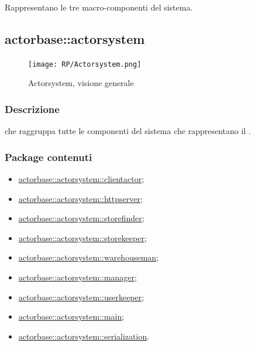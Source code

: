 \documentclass{scalatekids-article}
\begin{document}
Rappresentano le tre macro-componenti del sistema.


\subsection{actorbase::actorsystem} %
\label{sec:actorbase::actorsystem}

\begin{figure}[H]
  \begin{center}
    \texttt{[image: RP/Actorsystem.png]}
    \caption{Actorsystem, visione generale}
  \end{center}
\end{figure}

\subsubsection{Descrizione}

 che raggruppa tutte le componenti del sistema che
rappresentano il .

\subsubsection{Package contenuti}

\begin{itemize}
\item \hyperref[sec:actorbase::actorsystem::clientactor]{actorbase::actorsystem::clientactor};
\item \hyperref[sec:actorbase::actorsystem::httpserver]{actorbase::actorsystem::httpserver};
\item \hyperref[sec:actorbase::actorsystem::storefinder]{actorbase::actorsystem::storefinder};
\item \hyperref[sec:actorbase::actorsystem::storekeeper]{actorbase::actorsystem::storekeeper};
\item \hyperref[sec:actorbase::actorsystem::warehouseman]{actorbase::actorsystem::warehouseman};
\item \hyperref[sec:actorbase::actorsystem::manager]{actorbase::actorsystem::manager};
\item \hyperref[sec:actorbase::actorsystem::userkeeper]{actorbase::actorsystem::userkeeper};
\item \hyperref[sec:actorbase::actorsystem::main]{actorbase::actorsystem::main};
\item \hyperref[sec:actorbase::actorsystem::serialization]{actorbase::actorsystem::serialization}.
\end{itemize}
\end{document}
